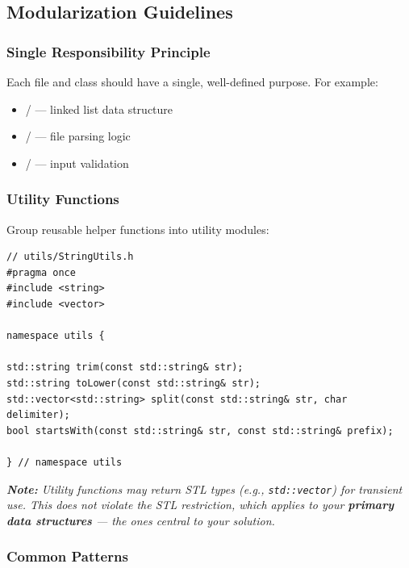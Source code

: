 \subsection{Modularization Guidelines}

\subsubsection{Single Responsibility Principle}

Each file and class should have a single, well-defined purpose. For example:

\begin{itemize}
  \item {} /  --- linked list data structure
  \item {} /  --- file parsing logic
  \item {} /  --- input validation
\end{itemize}

\subsubsection{Utility Functions}

Group reusable helper functions into utility modules:

\begin{lstlisting}[style=cpp]
// utils/StringUtils.h
#pragma once
#include <string>
#include <vector>

namespace utils {

std::string trim(const std::string& str);
std::string toLower(const std::string& str);
std::vector<std::string> split(const std::string& str, char delimiter);
bool startsWith(const std::string& str, const std::string& prefix);

} // namespace utils
\end{lstlisting}

\textit{\textbf{Note:} Utility functions may return STL types (e.g., \texttt{std::vector}) for transient use. This does not violate the STL restriction, which applies to your \textbf{primary data structures} --- the ones central to your solution.}

\subsubsection{Common Patterns}

